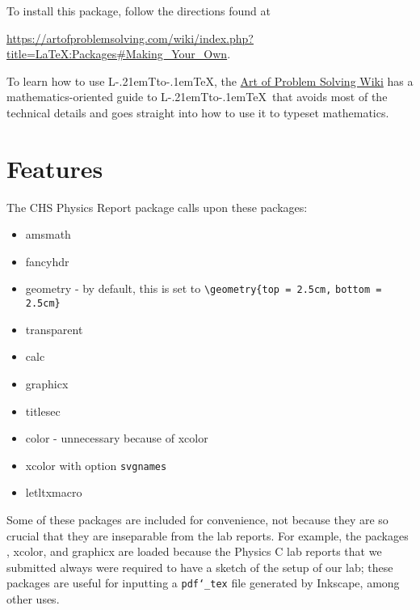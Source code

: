 \documentclass[12pt]{ltxdoc}
\makeatletter
\def\LaTeX{ L\kern -.21em{\sbox \z@ T\vbox to\ht \z@ {\hbox {\check@mathfonts \fontsize \sf@size \z@ \math@fontsfalse \selectfont A}\vss }}\kern -.1em\TeX}%
\makeatother
\begin{document}
To install this package, follow the directions found at 

\begin{minipage}{\textwidth - 2\parindent}\url{https://artofproblemsolving.com/wiki/index.php?title=LaTeX:Packages#Making_Your_Own}.\end{minipage}

To learn how to use \LaTeX, 
the \href{https://artofproblemsolving.com/wiki/index.php?title=LaTeX}{Art of Problem Solving Wiki} has a mathematics-oriented guide to \LaTeX\ that avoids most of the technical details and goes straight into how to use it to typeset mathematics. 

\section{Features}

The CHS Physics Report package calls upon these packages:
\begin{multicols}{2}
\begin{itemize}
\item{amsmath}\vspace{-.8\parskip}
\item{fancyhdr}\vspace{-.8\parskip}
\item{geometry} - by default, this is set to \verb|\geometry{top = 2.5cm,| \verb|bottom = 2.5cm}|\vspace{-.8\parskip}
\item{transparent}\vspace{-.8\parskip}
\item{calc}\vspace{-.8\parskip}
\item{graphicx}\vspace{-.8\parskip}
\item{titlesec}\vspace{-.8\parskip}
\item{color} - unnecessary because of xcolor\vspace{-.8\parskip}
\item{}{xcolor} with option \texttt{svgnames}\vspace{-.8\parskip}
\item{letltxmacro}
\end{itemize}
\end{multicols}
\noindent Some of these packages are included for convenience, not because they are so crucial that they are inseparable from the lab reports. For example, the packages , xcolor, and graphicx are loaded because the Physics C lab reports that we submitted always were required to have a sketch of the setup of our lab; these packages are useful for inputting a \texttt{pdf\char`\_tex} file generated by Inkscape, among other uses. 
\end{document}
